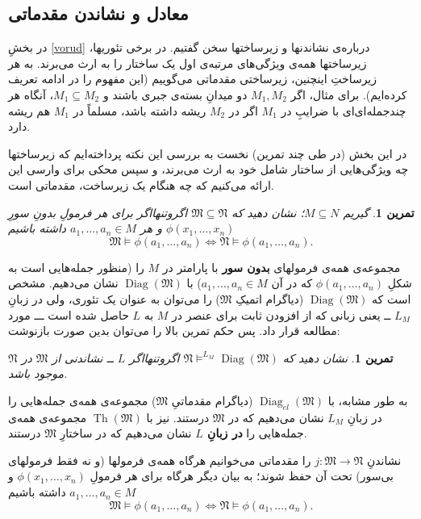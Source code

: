 \documentclass[12pt,a4paper]{report}
\theoremstyle{colorhead}
\newtheorem{tam}[thm]{تمرین}
\DeclareMathOperator{\Th}{Th}
\DeclareMathOperator{\diag}{Diag}
\begin{document}
\subsection{	معادل و نشاندن مقدماتی}
در بخشِ
\ref{vorud}
درباره‌ی نشاندنها و زیرساختها سخن گفتیم. در برخی تئوریها، زیرساختها همه‌ی ویژگی‌های مرتبه‌ی اول یک ساختار را به ارث می‌برند. به هر زیرساختِ اینچنین، زیرساختی مقدماتی می‌گوییم (این مفهوم را در ادامه تعریف کرده‌ایم).
برای مثال، اگر
$M_1,M_2$
دو میدانِ بسته‌ی جبری باشند و 
$M_1\subseteq M_2$،
آنگاه هر چندجمله‌ای‌ای با ضرایبِ در
$M_1$
اگر در
$M_2$
ریشه داشته باشد، مسلماً در
$M_1$
هم ریشه دارد. 
\par 
در این بخش  (در طی چند تمرین) نخست به بررسی این نکته پرداخته‌ایم که زیرساختها چه ويژگی‌هایی از
 ساختار شامل خود 
به ارث می‌برند،‌ و سپس محکی برای وارسی این ارائه می‌کنیم  که 
چه هنگام یک زیرساخت، مقدماتی است.
\begin{tam}
گیریم
$M\subseteq N$؛
نشان دهید که
$\mathfrak{M}\subseteq \mathfrak{N}$
اگروتنهااگر برای هر فرمولِ
بدونِ سورِ
$\phi(x_1,\ldots,x_n)$
و هر
$a_1,\ldots, a_n\in M$
داشته باشیم
\[
\mathfrak{M}\models \phi(a_1,\ldots,a_n)\Leftrightarrow\mathfrak{N}\models \phi(a_1,\ldots,a_n).
\]
\end{tam}
مجموعه‌ی همه‌ی فرمولهای \textbf{بدون سور} با پارامتر در
$M$
را 
(منظور جمله‌هایی است به شکلِ
$\phi(a_1,\ldots,a_n)$
که در آن
$a_1,\ldots,a_n\in M$)
با
$\diag(\mathfrak{M})$
نشان می‌دهیم. مشخص است که
$\diag(\mathfrak{M})$
(دیاگرام اتمیکِ
$\mathfrak{M}$)
را می‌توان به عنوان یک تئوری، ولی در زبانِ
$L_M$ ــ
یعنی زبانی که از افزودن ثابت برای عنصر در
$M$
به
$L$ 
حاصل شده است ـــ
 مورد مطالعه قرار داد.
پس حکم تمرین بالا را می‌توان بدین صورت بازنوشت:
\begin{tam}
نشان دهید که
$\mathfrak{N}\models^{L_M} \diag(\mathfrak{M})$
اگروتنهااگر 
$L$ ــ
نشاندنی از 
$\mathfrak{M}$
در
$\mathfrak{N}$
موجود باشد.
\end{tam}
\par 
به طور مشابه،‌ با
$\diag_{el}(\mathfrak{M})$
(دیاگرام مقدماتیِ
$\mathfrak{M}$)
مجموعه‌ی همه‌ی جمله‌هایی را در زبانِ
$L_M$
نشان می‌دهیم که در
$\mathfrak{M}$
درستند. 
نیز با
$\Th(\mathfrak{M})$
مجموعه‌ی همه‌ی جمله‌هایی را 
\textbf{در زبانِ
$L$}
نشان می‌دهیم که در ساختارِ
$\mathfrak{M}$
درستند. 
\par 
نشاندنِ
$j:\mathfrak{M}\to \mathfrak{N}$
را مقدماتی می‌خوانیم هرگاه همه‌ی فرمولها (و نه فقط فرمولهای بی‌سور) تحت آن حفظ شوند؛ به بیان دیگر هرگاه
برای هر فرمولِ
$\phi(x_1,\ldots,x_n)$
و
$a_1,\ldots,a_n\in M$
داشته باشیم
\[
\mathfrak{M}\models \phi(a_1,\ldots,a_n)\Leftrightarrow\mathfrak{N}\models
\phi(a_1,\ldots,a_n).
\]
\end{document}

